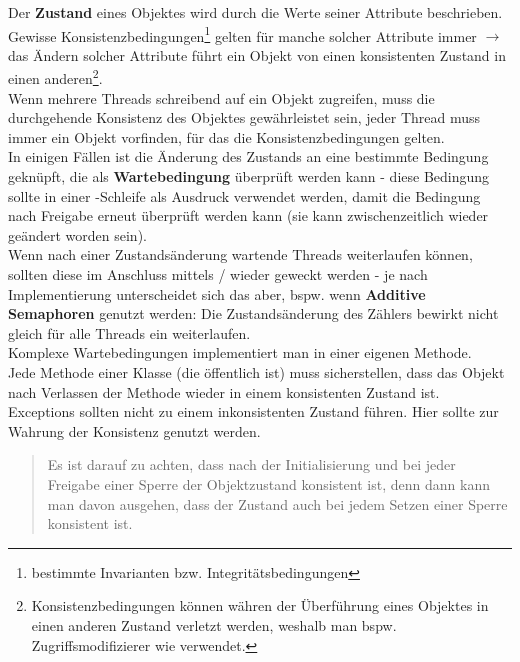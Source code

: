 Der \textbf{Zustand} eines Objektes wird durch die Werte seiner Attribute beschrieben.\\

\noindent
Gewisse Konsistenzbedingungen\footnote{bestimmte Invarianten bzw. Integritätsbedingungen} gelten für manche solcher Attribute immer $\rightarrow$ das Ändern solcher Attribute führt ein Objekt von einen konsistenten Zustand in einen anderen\footnote{
Konsistenzbedingungen können währen der Überführung eines Objektes in einen anderen Zustand verletzt werden, weshalb man bspw. Zugriffsmodifizierer wie  verwendet.
}.\\

\noindent
Wenn mehrere Threads schreibend auf ein Objekt zugreifen, muss die durchgehende Konsistenz des Objektes gewährleistet sein, jeder Thread muss immer ein Objekt vorfinden, für das die Konsistenzbedingungen gelten.\\

\noindent
In einigen Fällen ist die Änderung des Zustands an eine bestimmte Bedingung geknüpft, die als \textbf{Wartebedingung} überprüft werden kann - diese Bedingung sollte in einer -Schleife als Ausdruck verwendet werden, damit die Bedingung nach Freigabe erneut überprüft werden kann (sie kann zwischenzeitlich wieder geändert worden sein).\\

\noindent
Wenn nach einer Zustandsänderung wartende Threads weiterlaufen können, sollten diese im Anschluss mittels / wieder geweckt werden - je nach Implementierung unterscheidet sich das aber, bspw. wenn \textbf{Additive Semaphoren} genutzt werden: Die Zustandsänderung des Zählers bewirkt nicht gleich für alle Threads ein weiterlaufen.\\

\noindent
Komplexe Wartebedingungen implementiert man in einer eigenen Methode.\\

\noindent
Jede Methode einer Klasse (die öffentlich ist) muss sicherstellen, dass das Objekt nach Verlassen der Methode wieder in einem konsistenten Zustand ist.\\

\noindent
Exceptions sollten nicht zu einem inkonsistenten Zustand führen. Hier sollte  zur Wahrung der Konsistenz genutzt werden.

\blockquote[{\cite[142]{Oec22}}]{
Es ist darauf zu achten, dass nach der Initialisierung und bei jeder Freigabe einer Sperre der Objektzustand konsistent ist, denn dann kann man davon ausgehen, dass der Zustand auch bei jedem Setzen einer Sperre konsistent ist.
}

